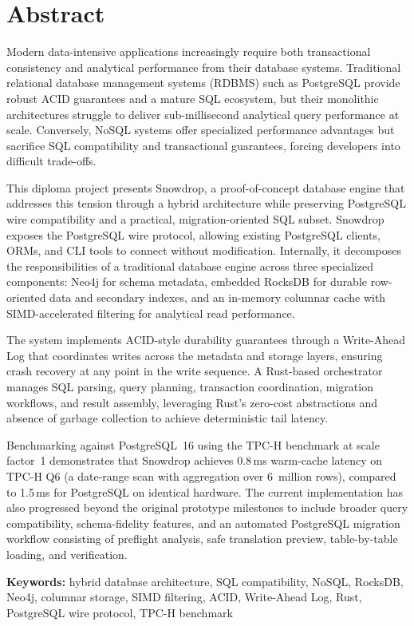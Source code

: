%
%
\chapter{Abstract}
\begin{SingleSpace}

Modern data-intensive applications increasingly require both transactional consistency and analytical performance from their database systems. Traditional relational database management systems (RDBMS) such as PostgreSQL provide robust ACID guarantees and a mature SQL ecosystem, but their monolithic architectures struggle to deliver sub-millisecond analytical query performance at scale. Conversely, NoSQL systems offer specialized performance advantages but sacrifice SQL compatibility and transactional guarantees, forcing developers into difficult trade-offs.

This diploma project presents Snowdrop, a proof-of-concept database engine that addresses this tension through a hybrid architecture while preserving PostgreSQL wire compatibility and a practical, migration-oriented SQL subset. Snowdrop exposes the PostgreSQL wire protocol, allowing existing PostgreSQL clients, ORMs, and CLI tools to connect without modification. Internally, it decomposes the responsibilities of a traditional database engine across three specialized components: Neo4j for schema metadata, embedded RocksDB for durable row-oriented data and secondary indexes, and an in-memory columnar cache with SIMD-accelerated filtering for analytical read performance.

The system implements ACID-style durability guarantees through a Write-Ahead Log that coordinates writes across the metadata and storage layers, ensuring crash recovery at any point in the write sequence. A Rust-based orchestrator manages SQL parsing, query planning, transaction coordination, migration workflows, and result assembly, leveraging Rust's zero-cost abstractions and absence of garbage collection to achieve deterministic tail latency.

Benchmarking against PostgreSQL~16 using the TPC-H benchmark at scale factor~1 demonstrates that Snowdrop achieves 0.8\,ms warm-cache latency on TPC-H Q6 (a date-range scan with aggregation over 6~million rows), compared to 1.5\,ms for PostgreSQL on identical hardware. The current implementation has also progressed beyond the original prototype milestones to include broader query compatibility, schema-fidelity features, and an automated PostgreSQL migration workflow consisting of preflight analysis, safe translation preview, table-by-table loading, and verification.

\bigskip
\noindent\textbf{Keywords:} hybrid database architecture, SQL compatibility, NoSQL, RocksDB, Neo4j, columnar storage, SIMD filtering, ACID, Write-Ahead Log, Rust, PostgreSQL wire protocol, TPC-H benchmark

\end{SingleSpace}
